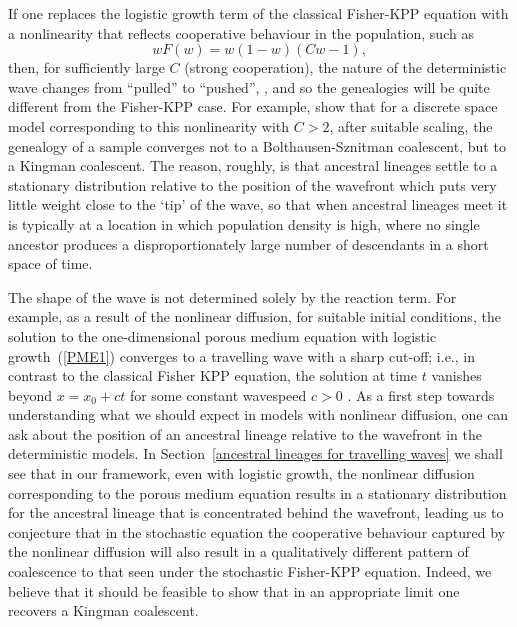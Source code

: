 \documentclass[EJP]{ejpecp} %
\newcommand{\citet}[1]{\cite{#1}}
\newcommand{\citep}[1]{\cite{#1}}
\begin{document}
If one replaces the logistic growth term of the classical
Fisher-KPP equation with a nonlinearity that reflects cooperative
behaviour in the population, such as
\begin{equation}
	\label{Birzu nonlinearity}
	wF(w)=w(1-w)(Cw-1),
\end{equation}
then, for sufficiently large $C$ (strong cooperation),
the nature of the deterministic
wave changes from ``pulled'' to ``pushed'',
\citep{birzu/hallatschek/korolev:2017, birzu/hallatschek/korolev:2021},
and so the genealogies will be quite different from the Fisher-KPP case. 
For example, \citet{etheridge/penington:2022}
show that for a discrete space model corresponding to this 
nonlinearity with $C>2$, after suitable scaling, the genealogy of a
sample converges not to a Bolthausen-Sznitman coalescent, but to
a Kingman coalescent. 
The reason, roughly, is that ancestral lineages
settle to a stationary distribution relative to the position of the 
wavefront which puts very little weight close to the `tip' of the wave, so
that when ancestral lineages meet
it is typically at a location in which population density is
high, where no single ancestor produces a disproportionately large number of 
descendants in a short space of time. 

The shape of the wave is not determined solely by the reaction term.
For example, as a result of the nonlinear diffusion, 
for suitable initial conditions, the solution to the one-dimensional 
porous medium equation with logistic growth~(\ref{PME1}) converges to a travelling
wave with a sharp cut-off; i.e., in contrast to the classical 
Fisher KPP equation, the solution at time $t$
vanishes beyond $x=x_0+ct$ for some constant wavespeed $c>0$ \citep{kamin/rosenau:2004}.
As a first step towards understanding what we should expect in models with
nonlinear diffusion, one can ask about the position of an ancestral lineage
relative to the wavefront in the deterministic models. In 
Section~\ref{ancestral lineages for travelling waves}
we shall see that in our framework, even with logistic growth, the nonlinear diffusion 
corresponding to the porous medium equation results
in a stationary distribution for the ancestral lineage
that is concentrated behind the wavefront, leading 
us to conjecture that in the stochastic equation
the cooperative behaviour captured by the nonlinear diffusion will also 
result in a qualitatively different pattern of coalescence to that seen under the 
stochastic Fisher-KPP equation. Indeed, we believe that it should be feasible to 
show that in an appropriate limit one recovers a Kingman coalescent.
\end{document}

